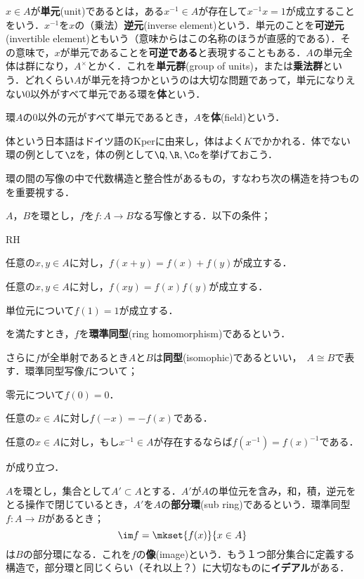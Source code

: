$x\in A$が\textbf{単元}(unit)であるとは，ある$x^{-1}\in A$が存在して$x^{-1}x=1$が成立することをいう．$x^{-1}$を$x$の（乗法）\textbf{逆元}(inverse element)という．単元のことを\textbf{可逆元}(invertible element)ともいう（意味からはこの名称のほうが直感的である）．その意味で，$x$が単元であることを\textbf{可逆である}と表現することもある．$A$の単元全体は群になり，$A^\times$とかく．これを\textbf{単元群}(group of units)，または\textbf{乗法群}という．どれくらい$A$が単元を持つかというのは大切な問題であって，単元になりえない$0$以外がすべて単元である環を\textbf{体}という．

\begin{defi}[体]
	環$A$の0以外の元がすべて単元であるとき，$A$を\textbf{体}(field)という．
\end{defi}

体という日本語はドイツ語のKperに由来し，体はよく$K$でかかれる．体でない環の例として$\Z$を，体の例として$\Q,\R,\Co$を挙げておこう．

環の間の写像の中で代数構造と整合性があるもの，すなわち次の構造を持つものを重要視する．

\begin{defi}[環準同型]
	$A，B$を環とし，$f$を$f:A\to B$なる写像とする．以下の条件；
	\begin{defiterm}{RH}
		\item 任意の$x,y\in A$に対し，$f(x+y)=f(x)+f(y)$が成立する．
		\item 任意の$x,y\in A$に対し，$f(xy)=f(x)f(y)$が成立する．
		\item 単位元について$f(1)=1$が成立する．
	\end{defiterm}
	
	を満たすとき，$f$を\textbf{環準同型}(ring homomorphism)であるという．
\end{defi}

さらに$f$が全単射であるとき$A$と$B$は\textbf{同型}(isomophic)であるといい，~$A\cong B$で表す．環準同型写像$f$について；

\begin{sakura}
	\item 零元について$f(0)=0$．
	\item 任意の$x\in A$に対し$f(-x)=-f(x)$である．
	\item 任意の$x\in A$に対し，もし$x^{-1}\in A$が存在するならば$f(x^{-1})=f(x)^{-1}$である．
\end{sakura}
が成り立つ．

$A$を環とし，集合として$A'\subset A$とする．$A'$が$A$の単位元を含み，和，積，逆元をとる操作で閉じているとき，$A'$を$A$の\textbf{部分環}(sub ring)であるという．環準同型$f:A\to B$があるとき；
\[\im f=\mkset{f(x)}{x\in A}\]
は$B$の部分環になる．これを$f$の\textbf{像}(image)という．もう１つ部分集合に定義する構造で，部分環と同じくらい（それ以上？）に大切なものに\textbf{イデアル}がある．

